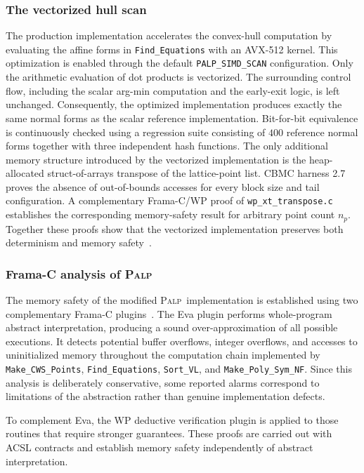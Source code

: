 \documentclass[appliedmath,article,submit,moreauthors]{Definitions/mdpi}
\newcommand{\PALP}{\textsc{Palp}}
\begin{document}
\subsubsection{The vectorized hull scan}

The production implementation accelerates the convex-hull computation by
evaluating the affine forms in \nolinkurl{Find\_Equations} with an AVX-512
kernel. This optimization is enabled through the default
\nolinkurl{PALP\_SIMD\_SCAN} configuration. Only the arithmetic evaluation of
dot products is vectorized. The surrounding control flow, including the scalar
arg-min computation and the early-exit logic, is left unchanged. Consequently,
the optimized implementation produces exactly the same normal forms as the
scalar reference implementation.
Bit-for-bit equivalence is continuously checked using a regression suite
consisting of \(400\) reference normal forms together with three independent
hash functions. The only additional memory structure introduced by the
vectorized implementation is the heap-allocated struct-of-arrays transpose of
the lattice-point list. CBMC harness 2.7 proves the absence of out-of-bounds
accesses for every block size and tail configuration. A complementary Frama-C/WP
proof of \nolinkurl{wp\_xt\_transpose.c} establishes the corresponding
memory-safety result for arbitrary point count \(n_p\). Together these proofs
show that the vectorized implementation preserves both determinism and memory
safety~\cite{CBMC,FramaC}.

\subsubsection{Frama-C analysis of \texorpdfstring{\PALP}{PALP}}
\label{sec:verification-framac}

The memory safety of the modified \PALP\ implementation is established using two
complementary Frama-C plugins~\cite{FramaC}. The Eva plugin performs
whole-program abstract interpretation, producing a sound over-approximation of
all possible executions. It detects potential buffer overflows, integer
overflows, and accesses to uninitialized memory throughout the computation chain
implemented by \nolinkurl{Make\_CWS\_Points}, \nolinkurl{Find\_Equations},
\nolinkurl{Sort\_VL}, and \nolinkurl{Make\_Poly\_Sym\_NF}. Since this analysis
is deliberately conservative, some reported alarms correspond to limitations of
the abstraction rather than genuine implementation defects.

To complement Eva, the WP deductive verification plugin is applied to those
routines that require stronger guarantees. These proofs are carried out with
ACSL contracts and establish memory safety independently of abstract
interpretation.
\end{document}
